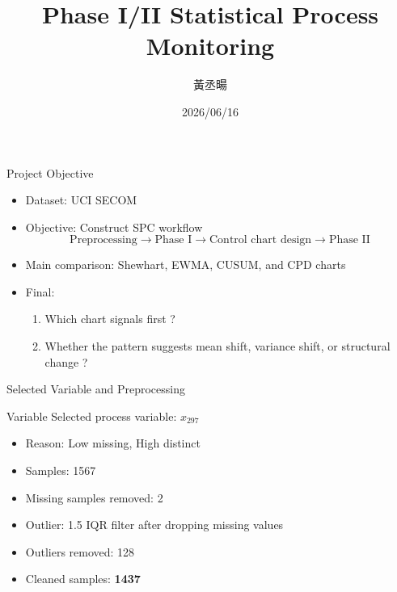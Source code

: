 \documentclass[aspectratio=169,12pt]{beamer}
\title{Phase I/II Statistical Process Monitoring}
\author{黃丞暘}
\institute{統計專論 (III) Final Report}
\date{2026/06/16}
\begin{document}
\begin{frame}
    \titlepage
\end{frame}

\begin{frame}{Project Objective}
    \begin{itemize}
        \item Dataset: UCI SECOM
        \item Objective: Construct SPC workflow %
        \[  
            \text{Preprocessing}
            \rightarrow
            \text{Phase I} %
            \rightarrow
            \text{Control chart design}
            \rightarrow
            \text{Phase II} %
        \]
        \item Main comparison: Shewhart, EWMA, CUSUM, and CPD charts
        \item Final:
        \begin{enumerate}[1.]
            \item Which chart signals first ?
            \item Whether the pattern suggests mean shift, variance shift, or structural change ?
        \end{enumerate}
    \end{itemize}
\end{frame}

\begin{frame}{Selected Variable and Preprocessing}
    \begin{block}{Variable}
        Selected process variable: \textbf{$x_{297}$}
    \end{block}
    \begin{itemize}
        \item Reason: Low missing, High distinct
        \item Samples: 1567
        \item Missing samples removed: 2
        \item Outlier: 1.5 IQR filter after dropping missing values
        \item Outliers removed: 128
        \item Cleaned samples: \textbf{1437}
    \end{itemize}
\end{frame}
\end{document}

